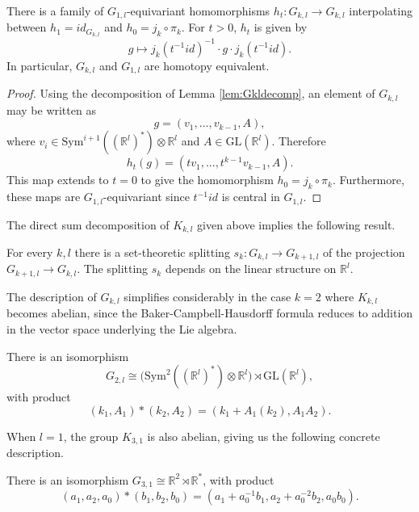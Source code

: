 \documentclass[10pt]{amsart}
\numberwithin{theoremalpha}{section}
\numberwithin{equation}{section}
\numberwithin{definition}{section}
\numberwithin{theorem}{section}
\numberwithin{proposition}{section}
\numberwithin{lemma}{section}
\numberwithin{example}{section}
\numberwithin{remark}{section}
\numberwithin{corollary}{section}
\numberwithin{question}{section}
\numberwithin{problem}{section}
\numberwithin{assumption}{section}
\theoremstyle{named}
\numberwithin{equation}{section}
\begin{document}
\begin{corollary} \label{cor:equivarianthomotopy}
There is a family of $G_{1,l}$-equivariant homomorphisms $h_{t} : G_{k,l} \to G_{k,l}$ interpolating between $h_{1} = id_{G_{k,l}}$ and $h_{0} = j_{k} \circ \pi_{k}$. For $t > 0$, $h_{t}$ is given by 
\begin{equation*}
g \mapsto j_{k}(t^{-1} id)^{-1} \cdot g \cdot j_{k}(t^{-1} id).
\end{equation*}
In particular, $G_{k,l}$ and $G_{1,l}$ are homotopy equivalent. 
\end{corollary}
\begin{proof}
Using the decomposition of Lemma \ref{lem:Gkldecomp}, an element of $G_{k,l}$ may be written as 
\[
g = (v_{1}, ..., v_{k-1}, A), 
\]
where $v_{i} \in \mathrm{Sym}^{i+1}( (\mathbb{R}^l)^* ) \otimes \mathbb{R}^l $ and $A \in \mathrm{GL}(\mathbb{R}^l)$. Therefore 
\[
h_{t}(g) = (t v_{1}, ..., t^{k-1} v_{k-1}, A). 
\]
This map extends to $t = 0$ to give the homomorphism $h_{0} = j_{k} \circ \pi_{k}$. Furthermore, these maps are $G_{1,l}$-equivariant since $t^{-1} id$ is central in $G_{1,l}$. 
\end{proof}

The direct sum decomposition of $K_{k,l}$ given above implies the following result. 
\begin{corollary} \label{canonicalsplitting}
For every $k,l$ there is a set-theoretic splitting $s_k: G_{k, l} \to G_{k+1,l}$ of the projection $G_{k+1, l} \to G_{k,l}$. The splitting $s_{k}$ depends on the linear structure on $\mathbb{R}^l$. 
\end{corollary}

The description of $G_{k,l}$ simplifies considerably in the case $k = 2$ where $K_{k,l}$ becomes abelian, since the Baker-Campbell-Hausdorff formula reduces to addition in the vector space underlying the Lie algebra. 
\begin{corollary}\label{cor:g2lgroup}
There is an isomorphism 
\[
G_{2,l} \cong \big( \mathrm{Sym}^{2}( (\mathbb{R}^l)^* ) \otimes \mathbb{R}^l \big) \rtimes \mathrm{GL}(\mathbb{R}^l),
\]
with product  
\[
(k_{1}, A_{1}) \ast (k_{2}, A_{2}) = (k_{1} + A_{1}(k_{2}), A_{1} A_{2}). 
\]
\end{corollary}
When $l = 1$, the group $K_{3,1}$ is also abelian, giving us the following concrete description. 
\begin{corollary}\label{cor:g31group}
There is an isomorphism $G_{3,1} \cong \mathbb{R}^2 \rtimes \mathbb{R}^*$, with product 
\[
(a_{1}, a_{2}, a_{0}) \ast (b_{1}, b_{2}, b_{0}) = (a_{1} + a_{0}^{-1}b_{1}, a_{2} + a_{0}^{-2}b_{2}, a_{0}b_{0}). 
\]
\end{corollary}
\end{document}
